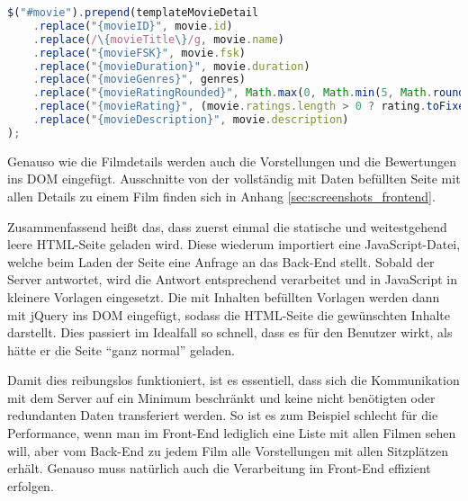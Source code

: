 \begin{lstlisting}[language=JavaScript, caption={Einfügen der Filmdetails ins \acs{DOM} mit jQuery}, label={lst:js_write_movie_detail_to_dom}]
$("#movie").prepend(templateMovieDetail
	.replace("{movieID}", movie.id)
	.replace(/\{movieTitle\}/g, movie.name)
	.replace("{movieFSK}", movie.fsk)
	.replace("{movieDuration}", movie.duration)
	.replace("{movieGenres}", genres)
	.replace("{movieRatingRounded}", Math.max(0, Math.min(5, Math.round(rating))))
	.replace("{movieRating}", (movie.ratings.length > 0 ? rating.toFixed(1).replace(".",",") : "") + " (" + movie.ratings.length + " Bewertung" + (movie.ratings.length == 1 ? "" : "en") + ")")
	.replace("{movieDescription}", movie.description)
);
\end{lstlisting}

Genauso wie die Filmdetails werden auch die Vorstellungen und die Bewertungen ins \acs{DOM} eingefügt.
Ausschnitte von der vollständig mit Daten befüllten Seite mit allen Details zu einem Film finden sich in Anhang \vref{sec:screenshots_frontend}.

Zusammenfassend heißt das, dass zuerst einmal die statische und weitestgehend leere \acs{HTML}-Seite geladen wird.
Diese wiederum importiert eine JavaScript-Datei, welche beim Laden der Seite eine Anfrage an das Back-End stellt.
Sobald der Server antwortet, wird die Antwort entsprechend verarbeitet und in JavaScript in kleinere Vorlagen eingesetzt.
Die mit Inhalten befüllten Vorlagen werden dann mit jQuery ins \acs{DOM} eingefügt, sodass die \acs{HTML}-Seite die gewünschten Inhalte darstellt.
Dies passiert im Idealfall so schnell, dass es für den Benutzer wirkt, als hätte er die Seite \enquote{ganz normal} geladen.

Damit dies reibungslos funktioniert, ist es essentiell, dass sich die Kommunikation mit dem Server auf ein Minimum beschränkt und keine nicht benötigten oder redundanten Daten transferiert werden.
So ist es zum Beispiel schlecht für die Performance, wenn man im Front-End lediglich eine Liste mit allen Filmen sehen will, aber vom Back-End zu jedem Film alle Vorstellungen mit allen Sitzplätzen erhält.
Genauso muss natürlich auch die Verarbeitung im Front-End effizient erfolgen.